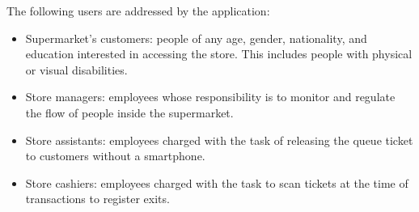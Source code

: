 \documentclass[../../main.tex]{subfiles}
\begin{document}
	The following users are addressed by the application:
	\begin{itemize}
		\item Supermarket's customers: people of any age, gender, nationality, and education interested in accessing the store. This includes people with physical or visual disabilities.
		\item Store managers: employees whose responsibility is to monitor and regulate the flow of people inside the supermarket.
		\item Store assistants: employees charged with the task of releasing the queue ticket to customers without a smartphone.
		\item Store cashiers: employees charged with the task to scan tickets at the time of transactions to register exits.
	\end{itemize}
\end{document}
